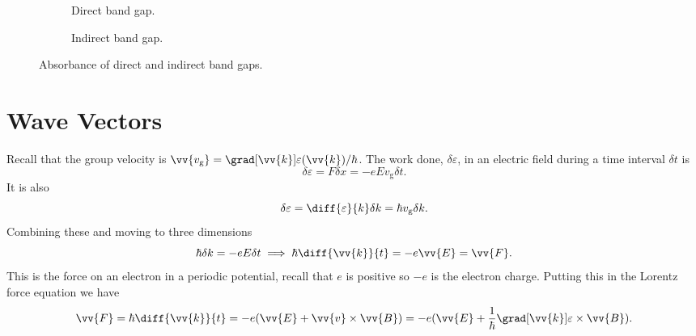 \documentclass[fleqn]{NotesClass}
\begin{document}
    \begin{figure}
        \begin{subfigure}{0.4\textwidth}
            \centering
            \caption{Direct band gap.}
        \end{subfigure}
        \begin{subfigure}{0.4\textwidth}
            \centering
            \caption{Indirect band gap.}
        \end{subfigure}
        \caption{Absorbance of direct and indirect band gaps.}
        \label{fig:absorbance}
    \end{figure}

    \section{Wave Vectors}
    Recall that the group velocity is \(\vv{v_{\mathrm{g}}} = \grad[\vv{k}]\varepsilon(\vv{k})/\hbar\).
    The work done, \(\delta\varepsilon\), in an electric field during a time interval \(\delta t\) is
    \begin{equation}
        \delta\varepsilon = F\delta x = -eE v_{\mathrm{g}}\delta t.
    \end{equation}
    It is also
    \begin{equation}
        \delta \varepsilon = \diff{\varepsilon}{k}\delta k = \hbar v_{\mathrm{g}}\delta k.
    \end{equation}
    Combining these and moving to three dimensions
    \begin{equation}
        \hbar\delta k = -eE\delta t \implies \hbar\diff{\vv{k}}{t} = -e\vv{E} = \vv{F}.
    \end{equation}
    This is the force on an electron in a periodic potential, recall that \(e\) is positive so \(-e\) is the electron charge.
    Putting this in the Lorentz force equation we have
    \begin{equation}
        \vv{F} = \hbar\diff{\vv{k}}{t} = -e(\vv{E} + \vv{v} \times \vv{B}) = -e(\vv{E} + \frac{1}{\hbar}\grad[\vv{k}]\varepsilon \times\vv{B}).
    \end{equation}
    
\end{document}
